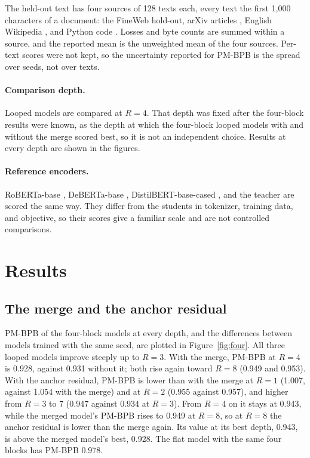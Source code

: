 \documentclass[11pt]{article}
\begin{document}
The held-out text has four sources of 128 texts each, every text the first 1,000 characters of a document: the FineWeb hold-out, arXiv articles
\citep{cohan2018arxiv}, English Wikipedia \citep{wikimedia2023wikipedia}, and Python code \citep{codeparrot2022clean}. Losses and byte counts
are summed within a source, and the reported mean is the unweighted mean of the four sources. Per-text scores were not kept, so the uncertainty
reported for PM-BPB is the spread over seeds, not over texts.

\paragraph{Comparison depth.}
Looped models are compared at $R = 4$. That depth was fixed after the four-block results were known, as the depth at which the four-block
looped models with and without the merge scored best, so it is not an independent choice. Results at every depth are shown in the figures.

\paragraph{Reference encoders.}
RoBERTa-base \citep{liu2019roberta}, DeBERTa-base \citep{he2021deberta}, DistilBERT-base-cased \citep{sanh2019distilbert}, and the teacher are
scored the same way. They differ from the students in tokenizer, training data, and objective, so their scores give a familiar scale and are not
controlled comparisons.

\section{Results}
\label{sec:results}

\subsection{The merge and the anchor residual}
\label{sec:merge}

PM-BPB of the four-block models at every depth, and the differences between models trained with the same seed, are plotted in
Figure~\ref{fig:four}. All three looped models improve steeply up to $R = 3$. With the merge,
PM-BPB at $R = 4$ is 0.928, against 0.931 without it; both rise again toward $R = 8$ (0.949 and 0.953). With the anchor residual, PM-BPB is
lower than with the merge at $R = 1$ (1.007, against 1.054 with the merge) and at $R = 2$ (0.955 against 0.957), and higher from $R = 3$ to 7
(0.947 against 0.934 at $R = 3$). From $R = 4$ on it stays at 0.943, while the merged model's PM-BPB rises to 0.949 at $R = 8$, so at $R = 8$ the
anchor residual is lower than the merge again. Its value at its best depth, 0.943, is above the merged model's best, 0.928. The flat
model with the same four blocks has PM-BPB 0.978.
\end{document}
